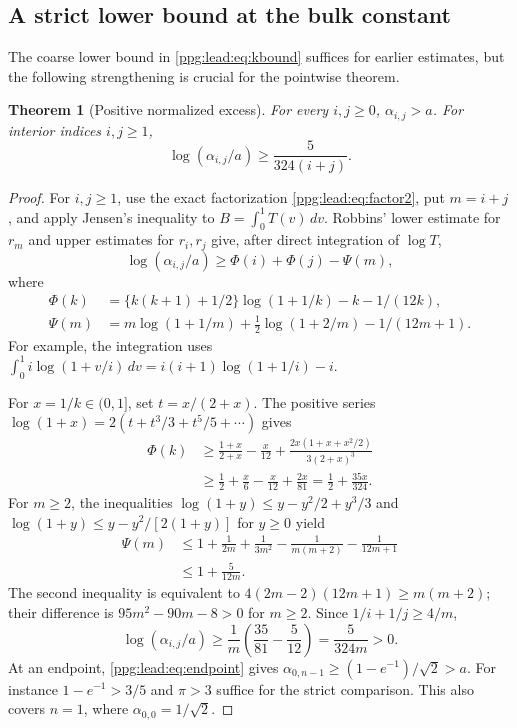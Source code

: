 \documentclass[11pt,letterpaper]{article}
\newtheorem{theorem}{Theorem}[section]
\theoremstyle{remark}\newtheorem{remark}[theorem]{Remark}
\numberwithin{equation}{section}
\begin{document}
\subsection{A strict lower bound at the bulk constant}
The coarse lower bound in \eqref{ppg:lead:eq:kbound} suffices for earlier estimates, but the following strengthening is crucial for the pointwise theorem.

\begin{theorem}[Positive normalized excess]\label{ppg:lead:thm:stronglower}
For every $i,j\ge0$, $\alpha_{i,j}>a$. For interior indices $i,j\ge1$,
\begin{equation}\label{ppg:lead:eq:stronglower}
 \log(\alpha_{i,j}/a)\ge\frac5{324(i+j)}.
\end{equation}
\end{theorem}
\begin{proof}
For $i,j\ge1$, use the exact factorization \eqref{ppg:lead:eq:factor2}, put $m=i+j$, and apply Jensen's inequality to $B=\int_0^1T(v)\,dv$. Robbins' lower estimate for $r_m$ and upper estimates for $r_i,r_j$ give, after direct integration of $\log T$,
\[
 \log(\alpha_{i,j}/a)\ge \Phi(i)+\Phi(j)-\Psi(m),
\]
where
\begin{align*}
 \Phi(k)&=\{k(k+1)+1/2\}\log(1+1/k)-k-1/(12k),\\
 \Psi(m)&=m\log(1+1/m)+\tfrac12\log(1+2/m)-1/(12m+1).
\end{align*}
For example, the integration uses
$\int_0^1 i\log(1+v/i)\,dv=i(i+1)\log(1+1/i)-i$.

For $x=1/k\in(0,1]$, set $t=x/(2+x)$. The positive series
$\log(1+x)=2(t+t^3/3+t^5/5+\cdots)$ gives
\begin{align*}
 \Phi(k)&\ge\frac{1+x}{2+x}-\frac x{12}
       +\frac{2x(1+x+x^2/2)}{3(2+x)^3}\\
 &\ge\frac12+\frac x6-\frac x{12}+\frac{2x}{81}
  =\frac12+\frac{35x}{324}.
\end{align*}
For $m\ge2$, the inequalities
$\log(1+y)\le y-y^2/2+y^3/3$ and
$\log(1+y)\le y-y^2/[2(1+y)]$ for $y\ge0$ yield
\begin{align*}
 \Psi(m)&\le1+\frac1{2m}+\frac1{3m^2}
                 -\frac1{m(m+2)}-\frac1{12m+1}\\
 &\le1+\frac5{12m}.
\end{align*}
The second inequality is equivalent to
$4(2m-2)(12m+1)\ge m(m+2)$; their difference is
$95m^2-90m-8>0$ for $m\ge2$. Since $1/i+1/j\ge4/m$,
\[
 \log(\alpha_{i,j}/a)\ge\frac1m\left(\frac{35}{81}-\frac5{12}\right)
 =\frac5{324m}>0.
\]
At an endpoint, \eqref{ppg:lead:eq:endpoint} gives
$\alpha_{0,n-1}\ge(1-e^{-1})/\sqrt2>a$.
For instance $1-e^{-1}>3/5$ and $\pi>3$ suffice for the strict comparison. This also covers $n=1$, where $\alpha_{0,0}=1/\sqrt2$.
\end{proof}
\end{document}
